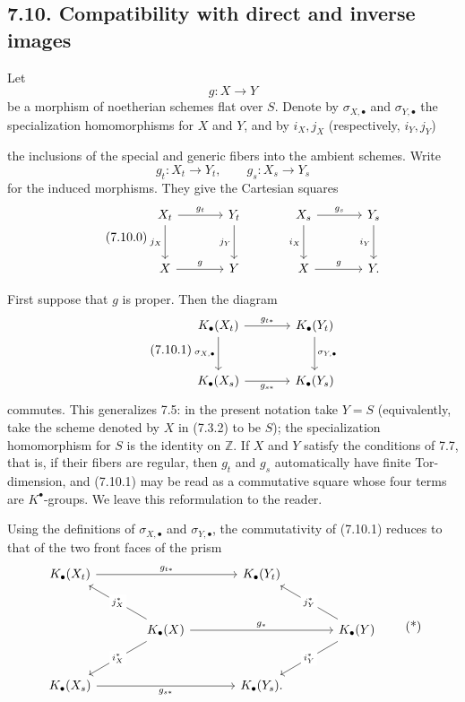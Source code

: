 \subsection*{7.10. Compatibility with direct and inverse images}
Let
\[
g:X\longrightarrow Y
\]
be a morphism of noetherian schemes flat over $S$. Denote by
$\sigma_{X,\bullet}$ and $\sigma_{Y,\bullet}$ the specialization
homomorphisms for $X$ and $Y$, and by
$i_X,j_X$ (respectively, $i_Y,j_Y$)

the inclusions of the special and generic fibers into the ambient schemes.
Write
\[
g_t:X_t\longrightarrow Y_t,
\qquad
g_s:X_s\longrightarrow Y_s
\]
for the induced morphisms. They give the Cartesian squares
\begin{equation}\tag{7.10.0}
\begin{tikzcd}[column sep=large,row sep=large]
X_t \arrow[r,"g_t"] \arrow[d,"j_X"'] & Y_t \arrow[d,"j_Y"'] &
X_s \arrow[r,"g_s"] \arrow[d,"i_X"'] & Y_s \arrow[d,"i_Y"']\\
X \arrow[r,"g"] & Y & X \arrow[r,"g"] & Y.
\end{tikzcd}
\end{equation}

First suppose that $g$ is proper. Then the diagram
\begin{equation}\tag{7.10.1}
\begin{tikzcd}[column sep=large,row sep=large]
K_\bullet(X_t) \arrow[r,"g_{t*}"] \arrow[d,"\sigma_{X,\bullet}"'] &
K_\bullet(Y_t) \arrow[d,"\sigma_{Y,\bullet}"]\\
K_\bullet(X_s) \arrow[r,"g_{s*}"'] & K_\bullet(Y_s)
\end{tikzcd}
\end{equation}
commutes. This generalizes 7.5: in the present notation take $Y=S$
(equivalently, take the scheme denoted by $X$ in (7.3.2) to be $S$); the
specialization homomorphism for $S$ is the identity on $\mathbb Z$. If $X$
and $Y$ satisfy the conditions of 7.7, that is, if their fibers are
regular, then $g_t$ and $g_s$ automatically have finite Tor-dimension, and
(7.10.1) may be read as a commutative square whose four terms are
$K^\bullet$-groups. We leave this reformulation to the reader.

Using the definitions of $\sigma_{X,\bullet}$ and $\sigma_{Y,\bullet}$,
the commutativity of (7.10.1) reduces to that of the two front faces of the
prism
\[
\begin{tikzcd}[column sep=large,row sep=large]
K_\bullet(X_t) \arrow[rr,"g_{t*}"] && K_\bullet(Y_t)\\
& K_\bullet(X) \arrow[ul,"j_X^*" description]
  \arrow[dl,"i_X^*" description] \arrow[rr,"g_*"] &&
K_\bullet(Y) \arrow[ul,"j_Y^*" description]
  \arrow[dl,"i_Y^*" description]\\
K_\bullet(X_s) \arrow[rr,"g_{s*}"'] && K_\bullet(Y_s).
\end{tikzcd}
\tag{*}
\]

